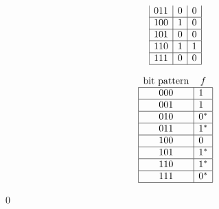 \begin{example}
\begin{minipage}{.95\linewidth}
\begin{minipage}[b]{.4\linewidth}
\begin{align*}
\begin{array}{ccc}
        \multicolumn{1}{|c|}{011} & \multicolumn{1}{c|}{0} & \multicolumn{1}{c|}{0}                \\ \hline
        \multicolumn{1}{|c|}{100} & \multicolumn{1}{c|}{1} & \multicolumn{1}{c|}{0}                \\ \hline
        \multicolumn{1}{|c|}{101} & \multicolumn{1}{c|}{0} & \multicolumn{1}{c|}{0}                \\ \hline
        \multicolumn{1}{|c|}{110} & \multicolumn{1}{c|}{1} & \multicolumn{1}{c|}{1}                \\ \hline
        \multicolumn{1}{|c|}{111} & \multicolumn{1}{c|}{0} & \multicolumn{1}{c|}{0}                \\ \hline
      \end{array}
    \end{align*}
  \end{minipage}
  \begin{minipage}[b]{.3\linewidth}\centering
    \begin{align*}
      \begin{array}{cc}
        \text{bit pattern}        & f                  \\ \hline
        \multicolumn{1}{|c|}{000} & \multicolumn{1}{l|}{1}   \\ \hline
        \multicolumn{1}{|c|}{001} & \multicolumn{1}{l|}{1}   \\ \hline
        \multicolumn{1}{|c|}{010} & \multicolumn{1}{l|}{0^*} \\ \hline
        \multicolumn{1}{|c|}{011} & \multicolumn{1}{l|}{1^*} \\ \hline
        \multicolumn{1}{|c|}{100} & \multicolumn{1}{l|}{0}   \\ \hline
        \multicolumn{1}{|c|}{101} & \multicolumn{1}{l|}{1^*}  \\ \hline
        \multicolumn{1}{|c|}{110} & \multicolumn{1}{l|}{1^*}  \\ \hline
        \multicolumn{1}{|c|}{111} & \multicolumn{1}{l|}{0^*} \\ \hline
      \end{array}
    \end{align*}
  \end{minipage}
\end{minipage}
  \normalfont
\end{example}
\qed

